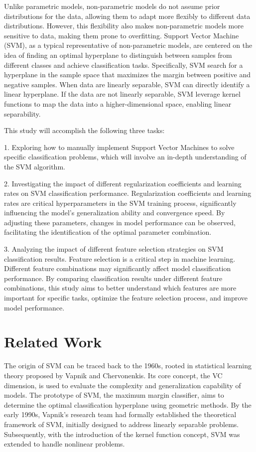 \documentclass[a4paper, utf8]{ctexart}
\begin{document}
	Unlike parametric models, non-parametric models do not assume prior distributions for the data, allowing them to adapt more flexibly to different data distributions. However, this flexibility also makes non-parametric models more sensitive to data, making them prone to overfitting. Support Vector Machine (SVM), as a typical representative of non-parametric models, are centered on the idea of finding an optimal hyperplane to distinguish between samples from different classes and achieve classification tasks. Specifically, SVM search for a hyperplane in the sample space that maximizes the margin between positive and negative samples. When data are linearly separable, SVM can directly identify a linear hyperplane. If the data are not linearly separable, SVM leverage kernel functions to map the data into a higher-dimensional space, enabling linear separability.
	
	This study will accomplish the following three tasks:
	
	1. Exploring how to manually implement Support Vector Machines to solve specific classification problems, which will involve an in-depth understanding of the SVM algorithm.
		
	2. Investigating the impact of different regularization coefficients and learning rates on SVM classification performance. Regularization coefficients and learning rates are critical hyperparameters in the SVM training process, significantly influencing the model's generalization ability and convergence speed. By adjusting these parameters, changes in model performance can be observed, facilitating the identification of the optimal parameter combination.
		
	3. Analyzing the impact of different feature selection strategies on SVM classification results. Feature selection is a critical step in machine learning. Different feature combinations may significantly affect model classification performance. By comparing classification results under different feature combinations, this study aims to better understand which features are more important for specific tasks, optimize the feature selection process, and improve model performance.
	
	\section{Related Work}
	
	The origin of SVM can be traced back to the 1960s, rooted in statistical learning theory proposed by Vapnik and Chervonenkis. Its core concept, the VC dimension, is used to evaluate the complexity and generalization capability of models. The prototype of SVM, the maximum margin classifier, aims to determine the optimal classification hyperplane using geometric methods. By the early 1990s, Vapnik's research team had formally established the theoretical framework of SVM, initially designed to address linearly separable problems. Subsequently, with the introduction of the kernel function concept, SVM was extended to handle nonlinear problems.
	
\end{document}
